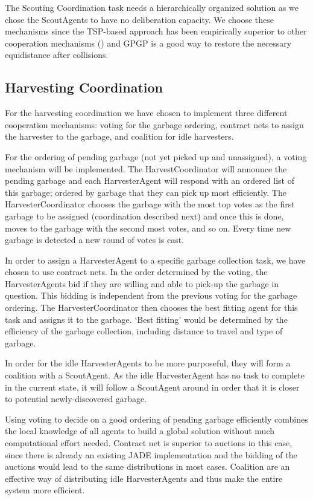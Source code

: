 The Scouting Coordination task needs a hierarchically organized solution as we chose the ScoutAgents to have no deliberation capacity. We choose these mechanisms since the TSP-based approach has been empirically superior to other cooperation mechanisms (\cite{Almeida2004}) and GPGP is a good way to restore the necessary equidistance after collisions.


\subsection{Harvesting Coordination}

For the harvesting coordination we have chosen to implement three different cooperation mechanisms: voting for the garbage ordering, contract nets to assign the harvester to the garbage, and coalition for idle harvesters. 

For the ordering of pending garbage (not yet picked up and unassigned), a voting mechanism will be implemented. The HarvestCoordinator will announce the pending garbage and each HarvesterAgent will respond with an ordered list of this garbage; ordered by garbage that they can pick up most efficiently. The HarvesterCoordinator chooses the garbage with the most top votes as the first garbage to be assigned (coordination described next) and once this is done, moves to the garbage with the second most votes, and so on. Every time new garbage is detected a new round of votes is cast.

In order to assign a HarvesterAgent to a specific garbage collection task, we have chosen to use contract nets. In the order determined by the voting, the HarvesterAgents bid if they are willing and able to pick-up the garbage in question. This bidding is independent from the previous voting for the garbage ordering. The HarvesterCoordinator then chooses the best fitting agent for this task and assigns it to the garbage. `Best fitting' would be determined by the efficiency of the garbage collection, including distance to travel and type of garbage. 

In order for the idle HarvesterAgents to be more purposeful, they will form a coalition with a ScoutAgent. As the idle HarvesterAgent has no task to complete in the current state, it will follow a ScoutAgent around in order that it is closer to potential newly-discovered garbage. 

Using voting to decide on a good ordering of pending garbage efficiently combines the local knowledge of all agents to build a global solution without much computational effort needed. 
Contract net is superior to auctions in this case, since there is already an existing JADE implementation and the bidding of the auctions would lead to the same distributions in most cases. 
Coalition are an effective way of distributing idle HarvesterAgents and thus make the entire system more efficient.

